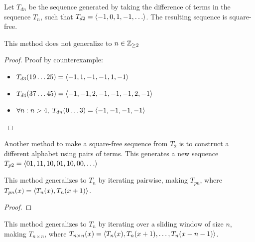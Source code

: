 \documentclass[conference]{IEEEtran}
\begin{document}

Let $T_{dn}$ be the sequence generated by taking the difference of terms in the sequence $T_n$, such that $T_{d2} = \langle -1, 0, 1, -1, \ldots \rangle$. The resulting sequence is square-free.

\begin{theorem}
\label{theo:square_free_dn}
This method does not generalize to $n \in \mathbb{Z}_{\ge2}$
\begin{proof}
\par\noindent\par Proof by counterexample: \begin{itemize}
    \item $T_{d3}(19\dots25) = \langle -1, 1, -1, -1, 1, -1 \rangle$
    \item $T_{d4}(37\dots45) = \langle -1, -1, 2, -1, -1, -1, 2, -1 \rangle$
    \item $\forall n : n > 4,\; T_{dn}(0\dots3) = \langle -1,-1,-1,-1 \rangle$
\end{itemize}
\end{proof}
\end{theorem}

Another method to make a square-free sequence from $T_2$ is to construct a different alphabet \cite{offner_repetitions} using pairs of terms. This generates a new sequence $T_{p2} = \tuple{01, 11, 10, 01, 10, 00, \dots}$

\begin{conjecture}
\label{conj:square_free_pn} 
This method generalizes to $T_n$ by iterating pairwise, making $T_{pn}$, where $T_{pn}(x) = \langle T_n(x), T_n(x+1) \rangle$.
\end{conjecture}

\begin{proof}
\end{proof}

\begin{conjecture}
\label{conj:square_free_nxn}
This method generalizes to $T_n$ by iterating over a sliding window of size $n$, making $T_{n\times n}$, where $T_{n\times n}(x) = \langle T_n(x), T_n(x+1), \dots, T_n(x+n-1) \rangle$.
\end{conjecture}
\end{document}
